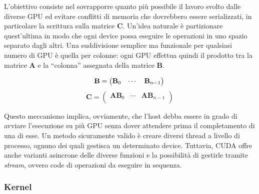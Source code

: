 \documentclass[a4paper]{article}
\begin{document}
L'obiettivo consiste nel sovrapporre quanto più possibile il lavoro svolto dalle diverse GPU ed evitare conflitti di memoria che dovrebbero essere serializzati, in particolare la scrittura sulla matrice $\mathbf{C}$. Un'idea naturale è partizionare quest'ultima in modo che ogni device possa eseguire le operazioni in uno spazio separato dagli altri.
Una suddivisione semplice ma funzionale per qualsiasi numero di GPU è quella per colonne: ogni GPU effettua quindi il prodotto tra la matrice $\mathbf{A}$ e la ``colonna'' assegnata della matrice $\mathbf{B}$.

$$
    \mathbf{B}=
    \begin{pmatrix}
        \mathbf{B}_{0} & \cdots & \mathbf{B}_{n - 1} \\
    \end{pmatrix}\\
$$
$$
    \mathbf{C}=
    \begin{pmatrix}
        \mathbf{A}\mathbf{B}_0 & \cdots & \mathbf{A}\mathbf{B}_{n-1} \\
    \end{pmatrix}
$$

Questo meccanismo implica, ovviamente, che l'host debba essere in grado di avviare l'esecuzione su più GPU senza dover attendere prima il completamento di una di esse.
Un metodo sicuramente valido è creare diversi thread a livello di processo, ognuno dei quali gestisca un determinato device.
Tuttavia, CUDA offre anche varianti asincrone delle diverse funzioni e la possibilità di gestirle tramite \textit{stream}, ovvero code di operazioni da eseguire in sequenza.


\subsubsection{Kernel}
\end{document}
